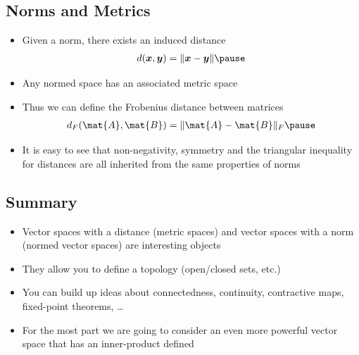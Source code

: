 
\begin{slide}
\section{Norms and Metrics}

\begin{PauseHighLight}
  \begin{itemize}
  \item Given a norm, there exists an induced distance
    \begin{align*}
      d(\bm{x}, \bm{y}) = \| \bm{x} - \bm{y} \|\pause
    \end{align*}
  \item Any normed space has an associated metric space\pause
  \item Thus we can define the Frobenius distance between matrices
    \begin{align*}
      d_F(\mat{A}, \mat{B}) = \| \mat{A} - \mat{B} \|_F\pause
    \end{align*}
  \item It is easy to see that non-negativity, symmetry and the
    triangular inequality for distances are all inherited from the
    same properties of norms\pause
  \end{itemize}
\end{PauseHighLight}

\end{slide}



\begin{slide}
\section{Summary}

\begin{PauseHighLight}
  \begin{itemize}
  \item Vector spaces with a distance (metric spaces) and vector spaces
    with a norm (normed vector spaces) are interesting objects\pause
  \item They allow you to define a topology (open/closed sets, etc.)\pause
  \item You can build up ideas about connectedness, continuity,
    contractive maps, fixed-point theorems, \ldots\pause
  \item For the most part we are going to consider an even more powerful
    vector space that has an inner-product defined\pause
  \end{itemize}
\end{PauseHighLight}

\end{slide}





